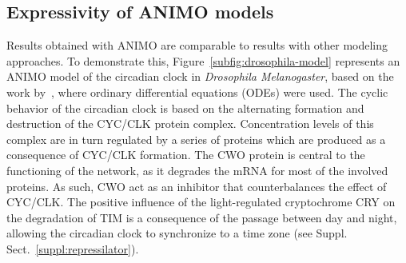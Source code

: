 \subsection{Expressivity of ANIMO models}\label{sec:animo-drosophila}
Results obtained with ANIMO are comparable to results with other modeling
approaches. To demonstrate this, Figure~\ref{subfig:drosophila-model}
represents an ANIMO model of the circadian clock in \emph{Drosophila Melanogaster}, based on the work
by~\cite{drosophila-ode-model}, where ordinary differential equations (ODEs) were used.
The cyclic behavior of the circadian clock is based on the alternating formation and destruction of the
CYC/CLK protein complex.
Concentration levels of this complex are in turn regulated by a series of proteins which are produced as
a consequence of CYC/CLK formation. The CWO protein
is central to the functioning of the network, as it degrades the mRNA for most of the involved proteins.
As such, CWO act as an inhibitor that counterbalances the effect of CYC/CLK.
The positive influence of the light-regulated cryptochrome CRY on the degradation of TIM is a consequence
of the passage between day and night, allowing
the circadian clock to synchronize to a time zone (see Suppl. Sect.~\ref{suppl:repressilator}).


\def\drosophilaGraphScale{0.069}%

